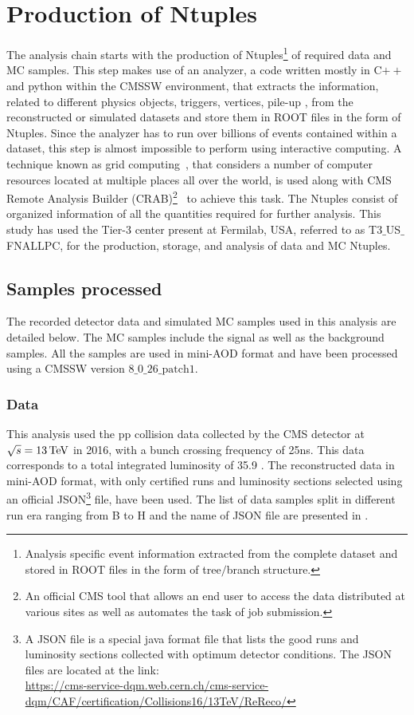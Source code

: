 \section{Production of Ntuples}
The analysis chain starts with the production of Ntuples\footnote{Analysis specific event information extracted from the complete dataset and stored in
  ROOT files in the form of tree$/$branch structure.} of required data and MC samples. This step makes use of an analyzer, a code written mostly in C$++$ and python
within the CMSSW environment, that extracts the information, related to different physics objects, triggers, vertices, pile-up \etc, from the reconstructed or
simulated datasets and store them in ROOT files in
the form of Ntuples. Since the analyzer has to run over billions of events contained within a dataset,
this step is almost impossible to perform using interactive computing.
A technique known as grid computing~\cite{Eck:840543}, that considers a number of computer resources located at multiple places all over the world, is used along with
CMS Remote Analysis Builder (CRAB)\footnote{An official CMS tool that allows an end user to access the data distributed at various sites as well as automates the
  task of job submission.}~\cite{Sala:1358821} to achieve this task. The Ntuples consist of organized information of all the quantities required for further
analysis. This study has used the Tier-3 center present at Fermilab, USA, referred to as T3$\_$US$\_$FNALLPC, for the production, storage, and
analysis of data and MC Ntuples. 
\subsection{Samples processed}
The recorded detector data and simulated MC samples used in this analysis are detailed below. The MC samples include the signal as well as the background samples.
All the samples are used in mini-AOD format and have been processed using a CMSSW version $8\_0\_26\_\mathrm{patch}1$.
\subsubsection{Data}
This analysis used the pp collision data collected by the CMS detector at $ \sqrt{s}= 13\mathrm{\,TeV} $ in 2016, with a bunch crossing frequency of 25\unit{ns}.
This data corresponds to a total integrated luminosity of 35.9 \fbinv.
The reconstructed data in mini-AOD format, with only certified runs and luminosity sections selected using an official JSON\footnote{A JSON
  file is a special java format file that lists the good runs and luminosity sections collected with optimum detector
  conditions. The JSON files are located at the link:\\
  \scriptsize\url{https://cms-service-dqm.web.cern.ch/cms-service-dqm/CAF/certification/Collisions16/13TeV/ReReco/}} file, have been used.
The list of data samples split in different run era ranging from B to H and the name of JSON file are presented in \tab{\ref{Table:datasample}}.

\vspace{-0.3in}
